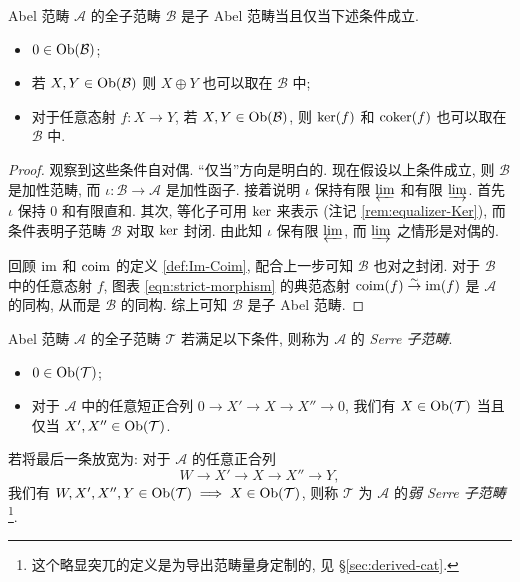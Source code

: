 \begin{proposition}\label{prop:Abel-subcat}
	Abel 范畴 $\mathcal{A}$ 的全子范畴 $\mathcal{B}$ 是子 Abel 范畴当且仅当下述条件成立.
	\begin{itemize}
		\item $0 \in \operatorname{Ob}(\mathcal{B})$;
		\item 若 $X, Y \in \operatorname{Ob}(\mathcal{B})$ 则 $X \oplus Y$ 也可以取在 $\mathcal{B}$ 中;
		\item 对于任意态射 $f: X \to Y$, 若 $X, Y \in \operatorname{Ob}(\mathcal{B})$, 则 $\operatorname{ker}(f)$ 和 $\operatorname{coker}(f)$ 也可以取在 $\mathcal{B}$ 中.
	\end{itemize}
\end{proposition}
\begin{proof}
	观察到这些条件自对偶. ``仅当''方向是明白的. 现在假设以上条件成立, 则 $\mathcal{B}$ 是加性范畴, 而 $\iota: \mathcal{B} \to \mathcal{A}$ 是加性函子. 接着说明 $\iota$ 保持有限 $\varprojlim$ 和有限 $\varinjlim$. 首先 $\iota$ 保持 $0$ 和有限直和. 其次, 等化子可用 $\operatorname{ker}$ 来表示 (注记 \ref{rem:equalizer-Ker}), 而条件表明子范畴 $\mathcal{B}$ 对取 $\operatorname{ker}$ 封闭. 由此知 $\iota$ 保有限 $\varprojlim$, 而 $\varinjlim$ 之情形是对偶的.

	回顾 $\operatorname{im}$ 和 $\operatorname{coim}$ 的定义 \ref{def:Im-Coim}, 配合上一步可知 $\mathcal{B}$ 也对之封闭. 对于 $\mathcal{B}$ 中的任意态射 $f$, 图表 \eqref{eqn:strict-morphism} 的典范态射 $\operatorname{coim}(f) \stackrel{\sim}{\rightarrow} \operatorname{im}(f)$ 是 $\mathcal{A}$ 的同构, 从而是 $\mathcal{B}$ 的同构. 综上可知 $\mathcal{B}$ 是子 Abel 范畴.
\end{proof}

\begin{definition}[J.-P.\ Serre]\label{def:Serre-subcat}
	Abel 范畴 $\mathcal{A}$ 的全子范畴 $\mathcal{T}$ 若满足以下条件, 则称为 $\mathcal{A}$ 的 \emph{Serre 子范畴}.
	\begin{itemize}
		\item $0 \in \operatorname{Ob}(\mathcal{T})$;
		\item 对于 $\mathcal{A}$ 中的任意短正合列 $0 \to X' \to X \to X'' \to 0$, 我们有 $X \in \operatorname{Ob}(\mathcal{T})$ 当且仅当 $X', X'' \in \operatorname{Ob}(\mathcal{T})$.
	\end{itemize}
	若将最后一条放宽为: 对于 $\mathcal{A}$ 的任意正合列
	\[ W \to X' \to X \to X'' \to Y, \]
	我们有 $W, X', X'', Y \in \operatorname{Ob}(\mathcal{T}) \implies X \in \operatorname{Ob}(\mathcal{T})$, 则称 $\mathcal{T}$ 为 $\mathcal{A}$ 的\emph{弱 Serre 子范畴}\footnote{这个略显突兀的定义是为导出范畴量身定制的, 见 \S\ref{sec:derived-cat}.}.
\end{definition}

